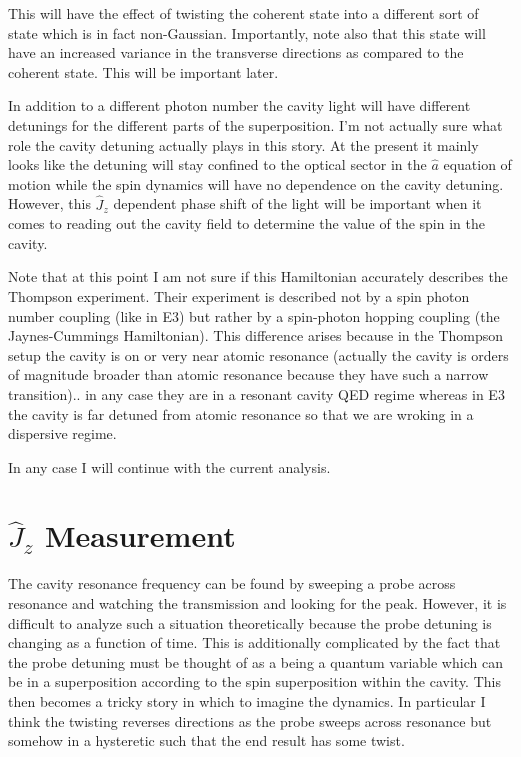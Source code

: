 \documentclass[12pt]{article}
\begin{document}
This will have the effect of twisting the coherent state into a different sort of state which is in fact non-Gaussian. Importantly, note also that this state will have an increased variance in the transverse directions as compared to the coherent state. This will be important later.

In addition to a different photon number the cavity light will have different detunings for the different parts of the superposition. I'm not actually sure what role the cavity detuning actually plays in this story. At the present it mainly looks like the detuning will stay confined to the optical sector in the $\hat{a}$ equation of motion while the spin dynamics will have no dependence on the cavity detuning. However, this $\hat{J}_z$ dependent phase shift of the light will be important when it comes to reading out the cavity field to determine the value of the spin in the cavity.

Note that at this point I am not sure if this Hamiltonian accurately describes the Thompson experiment. Their experiment is described not by a spin photon number coupling (like in E3) but rather by a spin-photon hopping coupling (the Jaynes-Cummings Hamiltonian). This difference arises because in the Thompson setup the cavity is on or very near atomic resonance (actually the cavity is orders of magnitude broader than atomic resonance because they have such a narrow transition).. in any case they are in a resonant cavity QED regime whereas in E3 the cavity is far detuned from atomic resonance so that we are wroking in a dispersive regime.

In any case I will continue with the current analysis.

\section{$\hat{J}_z$ Measurement}

The cavity resonance frequency can be found by sweeping a probe across resonance and watching the transmission and looking for the peak. However, it is difficult to analyze such a situation theoretically because the probe detuning is changing as a function of time. This is additionally complicated by the fact that the probe detuning must be thought of as a being a quantum variable which can be in a superposition according to the spin superposition within the cavity. This then becomes a tricky story in which to imagine the dynamics. In particular I think the twisting reverses directions as the probe sweeps across resonance but somehow in a hysteretic such that the end result has some twist.
\end{document}
